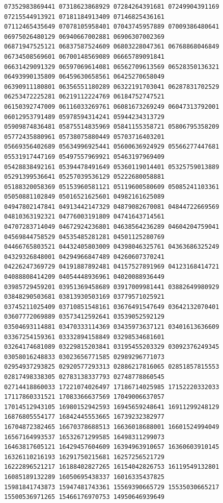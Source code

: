 \documentclass[10pt]{article}
\begin{document}
\begin{verbatim}
07352983869441 07318623868929 07284264391681 07249904391169 07215544913921 07181184913409 07146825436161
07112465435649 07078105958401 07043745957889 07009386480641 06975026480129 06940667002881 06906307002369
06871947525121 06837587524609 06803228047361 06768868046849 06734508569601 06700148569089 06665789091841
06631429091329 06597069614081 06562709613569 06528350136321 06493990135809 06459630658561 06425270658049
06390911180801 06356551180289 06322191703041 06287831702529 06253472225281 06219112224769 06184752747521
06150392747009 06116033269761 06081673269249 06047313792001 06012953791489 05978594314241 05944234313729
05909874836481 05875514835969 05841155358721 05806795358209 05772435880961 05738075880449 05703716403201
05669356402689 05634996925441 05600636924929 05566277447681 05531917447169 05497557969921 05463197969409
05428838492161 05394478491649 05360119014401 05325759013889 05291399536641 05257039536129 05222680058881
05188320058369 05153960581121 05119600580609 05085241103361 05050881102849 05016521625601 04982161625089
04947802147841 04913442147329 04879082670081 04844722669569 04810363192321 04776003191809 04741643714561
04707283714049 04672924236801 04638564236289 04604204759041 04569844758529 04535485281281 04501125280769
04466765803521 04432405803009 04398046325761 04363686325249 04329326848001 04294966847489 04260607370241
04226247369729 04191887892481 04157527891969 04123168414721 04088808414209 04054448936961 04020088936449
03985729459201 03951369458689 03917009981441 03882649980929 03848290503681 03813930503169 03779571025921
03745211025409 03710851548161 03676491547649 03642132070401 03607772069889 03573412592641 03539052592129
03504693114881 03470333114369 03435973637121 03401613636609 03367254159361 03332894158849 03298534681601
03264174681089 03229815203841 03195455203329 03092376249345 03058016248833 03023656771585 02989296771073
02954937293825 02920577293313 02886217816065 02851857815553 02817498338305 02783138337793 02748778860545
02714418860033 17221074026497 17186714025985 17152220332033 17117860331521 17083366637569 17049006637057
17014512943105 16980152942593 16945659248641 16911299248129 16876805554177 16842445553665 16739232382977
16704872382465 16670378688513 16636018688001 16601524994049 16567164993537 16532671299585 16498311299073
16463817605121 16429457604609 16394963910657 16360603910145 16326110216193 16291750215681 16257256521729
16222896521217 16188402827265 16154042826753 16119549132801 16085189132289 16050695438337 16016335437825
15981841743873 15947481743361 15569390665729 15535030665217 15500536971265 15466176970753 14950646939649

\end{verbatim}
\end{document}
